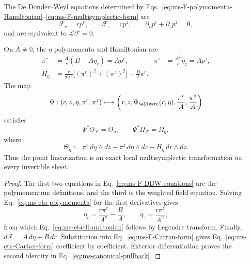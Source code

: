 \begin{theorem}
\label{thm:ms-covariant-canonical-map}
The De Donder--Weyl equations determined by
Eqs.~\eqref{eq:ms-F-polymomenta-Hamiltonian}--\eqref{eq:ms-F-multisymplectic-form}
are
\begin{equation}
\mathcal F_r=rp^r,
\qquad
\mathcal F_z=rp^z,
\qquad
\partial_rp^r+\partial_zp^z=0,
\label{eq:ms-F-DDW-equations}
\end{equation}
and are equivalent to $\mathcal L\mathcal F=0$.

On $A\neq0$, the $\eta$ polymomenta and Hamiltonian are
\begin{align}
\pi^r&=\frac{A}{r}(B+A\eta_r)=Ap^r,
&
\pi^z&=\frac{A^2}{r}\eta_z=Ap^z,
\label{eq:ms-eta-polymomenta}\\
H_\eta
&=\frac{r}{2A^2}\bigl[(\pi^r)^2+(\pi^z)^2\bigr]
-\frac BA\pi^r.
\label{eq:ms-eta-Hamiltonian}
\end{align}
The map
\begin{equation}
\Psi:(r,z,\eta,\pi^r,\pi^z)
\longmapsto
\left(r,z,\Phi_{\ellzero}(r,\eta),\frac{\pi^r}{A},
\frac{\pi^z}{A}\right)
\label{eq:ms-canonical-map}
\end{equation}
satisfies
\begin{equation}
\Psi^*\Theta_{\mathcal F}=\Theta_\eta,
\qquad
\Psi^*\Omega_{\mathcal F}=\Omega_\eta,
\label{eq:ms-canonical-pullback}
\end{equation}
where
\begin{equation}
\Theta_\eta
:=\pi^r\,d\eta\wedge dz
-\pi^z\,d\eta\wedge dr
-H_\eta\,dr\wedge dz.
\label{eq:ms-eta-Cartan-form}
\end{equation}
Thus the point linearization is an exact local multisymplectic
transformation on every invertible sheet.
\end{theorem}

\begin{proof}
The first two equations in Eq.~\eqref{eq:ms-F-DDW-equations} are the
polymomentum definitions, and the third is the weighted field equation.
Solving Eq.~\eqref{eq:ms-eta-polymomenta} for the first derivatives gives
\begin{equation}
\eta_r=\frac{r\pi^r}{A^2}-\frac BA,
\qquad
\eta_z=\frac{r\pi^z}{A^2},
\end{equation}
from which Eq.~\eqref{eq:ms-eta-Hamiltonian} follows by Legendre transform.
Finally, $d\mathcal F=A\,d\eta+B\,dr$. Substitution into
Eq.~\eqref{eq:ms-F-Cartan-form} gives Eq.~\eqref{eq:ms-eta-Cartan-form}
coefficient by coefficient. Exterior differentiation proves the second
identity in Eq.~\eqref{eq:ms-canonical-pullback}.
\end{proof}

